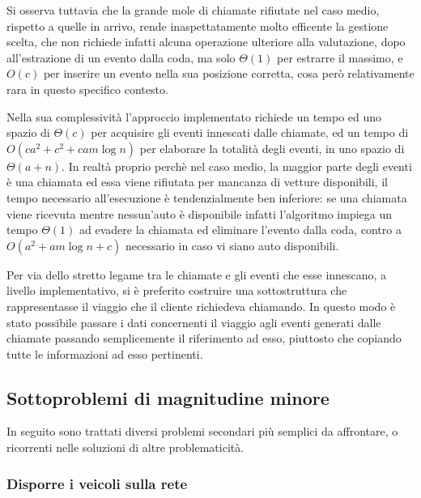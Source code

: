 \documentclass[a4paper,11pt]{Article}
\begin{document}
Si osserva tuttavia che la grande mole di chiamate rifiutate nel caso medio, rispetto a quelle in arrivo, rende inaspettatamente molto efficente la gestione scelta, che non richiede infatti alcuna operazione ulteriore alla valutazione, dopo all'estrazione di un evento dalla coda, ma solo $\Theta(1)$ per estrarre il massimo, e  $O(c)$ per inserire un evento nella sua posizione corretta, cosa però relativamente rara in questo specifico contesto.

Nella sua complessività l'approccio implementato richiede un tempo ed uno spazio di $\Theta(c)$ per acquisire gli eventi innescati dalle chiamate, ed un tempo di  $O(ca^2 + c^2 + cam\log{n})$ per elaborare la totalità degli eventi, in uno spazio di  $\Theta(a + n)$.
In realtà proprio perchè nel caso medio, la maggior parte degli eventi è una chiamata ed essa viene rifiutata per mancanza di vetture disponibili, il tempo necessario all'esecuzione è tendenzialmente ben inferiore: se una chiamata viene ricevuta mentre nessun'auto è disponibile infatti l'algoritmo impiega un tempo $\Theta(1)$ ad evadere la chiamata ed eliminare l'evento dalla coda, contro a $O(a^2+am\log{n} + c)$ necessario in caso vi siano auto disponibili.

Per via dello stretto legame tra le chiamate e gli eventi che esse innescano, a livello implementativo, si è preferito costruire una sottostruttura che rappresentasse il viaggio che il cliente richiedeva chiamando. In questo modo è stato possibile passare i dati concernenti il viaggio agli eventi generati dalle chiamate passando semplicemente il riferimento ad esso, piuttosto che copiando tutte le informazioni ad esso pertinenti.

\subsection{Sottoproblemi di magnitudine minore}
In seguito sono trattati diversi problemi secondari più semplici da affrontare, o ricorrenti nelle soluzioni di altre problematicità.

\subsubsection{Disporre i veicoli sulla rete}
\end{document}

